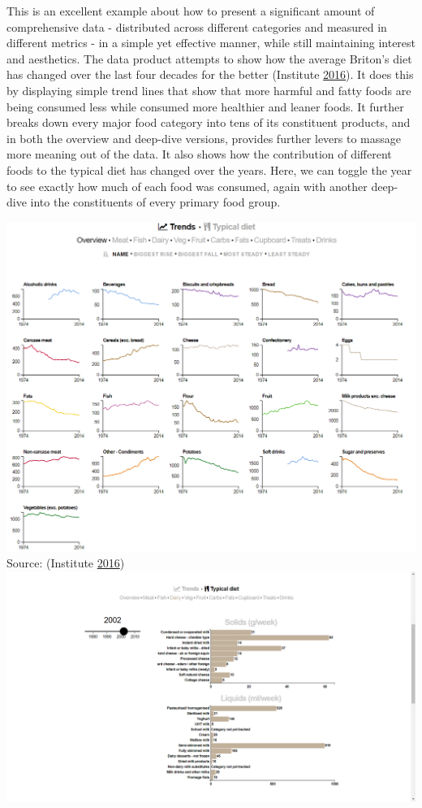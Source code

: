 \documentclass[]{book}
\begin{document}
This is an excellent example about how to present a significant amount of comprehensive data - distributed across different categories and measured in different metrics - in a simple yet effective manner, while still maintaining interest and aesthetics. The data product attempts to show how the average Briton's diet has changed over the last four decades for the better (Institute \protect\hyperlink{ref-britain_diet_2016}{2016}). It does this by displaying simple trend lines that show that more harmful and fatty foods are being consumed less while consumed more healthier and leaner foods. It further breaks down every major food category into tens of its constituent products, and in both the overview and deep-dive versions, provides further levers to massage more meaning out of the data. It also shows how the contribution of different foods to the typical diet has changed over the years. Here, we can toggle the year to see exactly how much of each food was consumed, again with another deep-dive into the constituents of every primary food group.

\includegraphics{images/britain-diet-data-trends.PNG}
Source: (Institute \protect\hyperlink{ref-britain_diet_2016}{2016})
\includegraphics{images/britain-diet-data-typical_diet.png}
\end{document}

